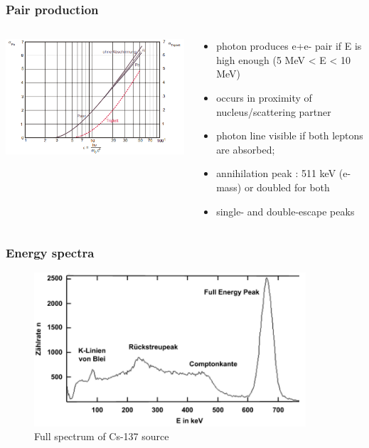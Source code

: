 \documentclass[aspectratio=1610, 9pt]{beamer}
\begin{document}
\begin{frame}\frametitle{Pair production}
  \begin{columns}
    \begin{column}[c]{0.48\textwidth}
      \includegraphics[width=\textwidth]{plots/pair_triplett.png}
    \end{column}
    \begin{column}[c]{0.48\textwidth}
      \begin{itemize}
        \item photon produces e+e- pair if E is high enough (5 MeV < E < 10 MeV)
        \item occurs in proximity of nucleus/scattering partner
        \item photon line visible if both leptons are absorbed;
        \item annihilation peak : 511 keV (e- mass) or doubled for both
        \item single- and double-escape peaks
      \end{itemize}
    \end{column}
  \end{columns}
\end{frame}

\begin{frame}\frametitle{Energy spectra}
  \begin{figure}
    \includegraphics[width=0.9\textwidth]{plots/full_spec.png}
    \caption{Full spectrum of Cs-137 source}
  \end{figure}
\end{frame}
\end{document}
